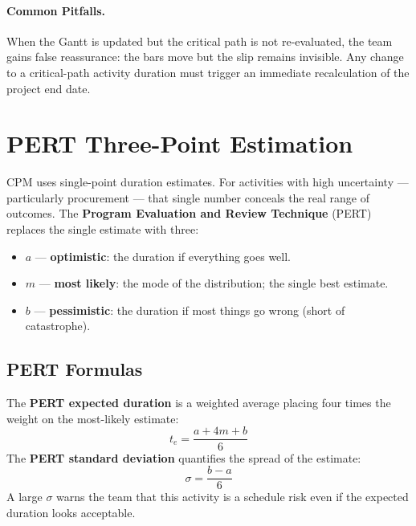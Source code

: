 \paragraph{Common Pitfalls.}
When the Gantt is updated but the critical path is not re-evaluated, the team gains false reassurance: the bars move but the slip remains invisible. Any change to a critical-path activity duration must trigger an immediate recalculation of the project end date.

\section{PERT Three-Point Estimation}
\label{sec:pert}

CPM uses single-point duration estimates.
For activities with high uncertainty --- particularly procurement ---
that single number conceals the real range of outcomes.
The \textbf{Program Evaluation and Review Technique}
 (PERT) replaces the
single estimate with three:

\begin{itemize}
  \item $a$ — \textbf{optimistic}: the
        duration if everything goes well.
  \item $m$ — \textbf{most likely}: the
        mode of the distribution; the single best estimate.
  \item $b$ — \textbf{pessimistic}: the
        duration if most things go wrong (short of catastrophe).
\end{itemize}

\subsection{PERT Formulas}

The \textbf{PERT expected duration} is a weighted average placing four times the weight on the most-likely estimate:
\begin{equation}
  t_e = \frac{a + 4m + b}{6}
  \label{eq:ch10-pert-te}
\end{equation}
The \textbf{PERT standard deviation} quantifies the spread of the estimate:
\begin{equation}
  \sigma = \frac{b - a}{6}
  \label{eq:ch10-pert-sigma}
\end{equation}
A large $\sigma$ warns the team that this activity is a schedule risk even if the expected duration looks acceptable.

